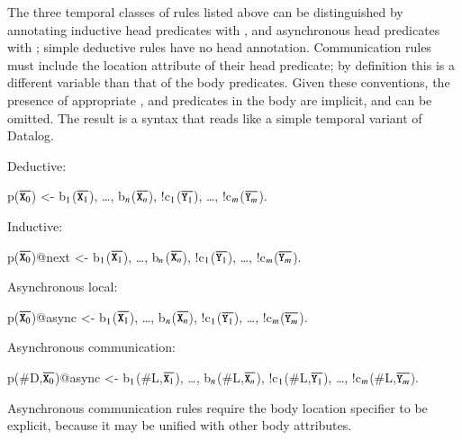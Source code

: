 The three temporal classes of rules listed above can be distinguished by annotating inductive head predicates with , and asynchronous head predicates with ; simple deductive rules have no head annotation. 
Communication rules must include the location attribute of their head predicate; by definition this is a different variable than that of the body predicates.
 Given these conventions, the presence of appropriate ,  and  predicates in the body are implicit, and can be omitted.  The result is a syntax that reads like a simple temporal variant of Datalog.

Deductive:

\begin{Dedalus}
p(\(\overline{\dedalus{X}\sb{0}}\)) <- b\(\sb{1}\)(\(\overline{\dedalus{X}\sb{1}}\)), \ldots, b\(\sb{n}\)(\(\overline{\dedalus{X}\sb{n}}\)),
!c\(\sb{1}\)(\(\overline{\dedalus{Y}\sb{1}}\)), \ldots, !c\(\sb{m}\)(\(\overline{\dedalus{Y}\sb{m}}\)).
\end{Dedalus}

Inductive:

\begin{Dedalus}
p(\(\overline{\dedalus{X}\sb{0}}\))@next <- b\(\sb{1}\)(\(\overline{\dedalus{X}\sb{1}}\)), \ldots, b\(\sb{n}\)(\(\overline{\dedalus{X}\sb{n}}\)),
!c\(\sb{1}\)(\(\overline{\dedalus{Y}\sb{1}}\)), \ldots, !c\(\sb{m}\)(\(\overline{\dedalus{Y}\sb{m}}\)).
\end{Dedalus}

Asynchronous local:

\begin{Dedalus}
p(\(\overline{\dedalus{X}\sb{0}}\))@async <- b\(\sb{1}\)(\(\overline{\dedalus{X}\sb{1}}\)), \ldots, b\(\sb{n}\)(\(\overline{\dedalus{X}\sb{n}}\)),
!c\(\sb{1}\)(\(\overline{\dedalus{Y}\sb{1}}\)), \ldots, !c\(\sb{m}\)(\(\overline{\dedalus{Y}\sb{m}}\)).
\end{Dedalus}

Asynchronous communication:

\begin{Dedalus}
p(#D,\(\overline{\dedalus{X}\sb{0}}\))@async <- b\(\sb{1}\)(#L,\(\overline{\dedalus{X}\sb{1}}\)), \ldots, b\(\sb{n}\)(#L,\(\overline{\dedalus{X}\sb{n}}\)),
!c\(\sb{1}\)(#L,\(\overline{\dedalus{Y}\sb{1}}\)), \ldots, !c\(\sb{m}\)(#L,\(\overline{\dedalus{Y}\sb{m}}\)).
\end{Dedalus}

Asynchronous communication rules require the body location specifier to be explicit, because it may be unified with other body attributes.


